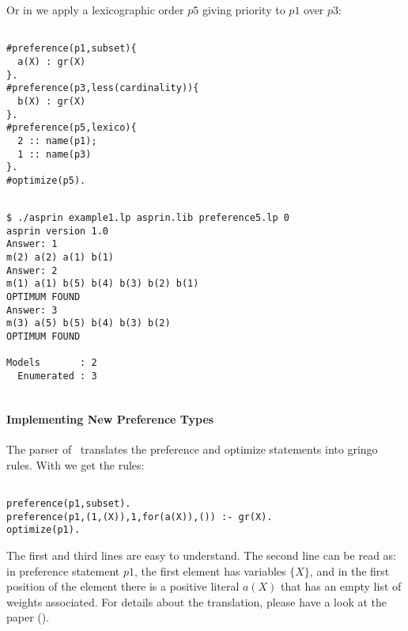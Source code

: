 Or in  we apply a lexicographic order $p5$ giving priority to $p1$ over $p3$: 
\begin{verbatim}

#preference(p1,subset){                                                                                             
  a(X) : gr(X)                                                                                                    
}.
#preference(p3,less(cardinality)){                                                                                             
  b(X) : gr(X)                                                                                                    
}.
#preference(p5,lexico){
  2 :: name(p1);
  1 :: name(p3)
}.
#optimize(p5).
\end{verbatim}
\begin{verbatim}

$ ./asprin example1.lp asprin.lib preference5.lp 0
asprin version 1.0
Answer: 1
m(2) a(2) a(1) b(1)
Answer: 2
m(1) a(1) b(5) b(4) b(3) b(2) b(1)
OPTIMUM FOUND
Answer: 3
m(3) a(5) b(5) b(4) b(3) b(2)
OPTIMUM FOUND

Models       : 2
  Enumerated : 3
  
\end{verbatim}

\paragraph{Implementing New Preference Types}

The parser of \asprin\ translates the preference and optimize statements into gringo rules.  
With  we get the rules: 
\begin{verbatim}

preference(p1,subset).
preference(p1,(1,(X)),1,for(a(X)),()) :- gr(X).
optimize(p1).
\end{verbatim}

The first and third lines are easy to understand. 
The second line can be read as: in preference statement $p1$, the first element has variables $\{X\}$,  
and in the first position of the element there is a positive literal $a(X)$  that has an empty list of weights associated. 
For details about the translation, please have a look at the paper (\cite{brderosc15a}). 


